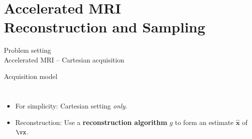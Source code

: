 

\section{Accelerated MRI\\[-3mm]{\normalsize Reconstruction and Sampling}}

\begin{frame}{Problem setting\\[-3mm]{\normalsize Accelerated MRI -- Cartesian acquisition}}
\vspace{-2mm}
 \begin{block}{Acquisition model}
\centering
{}
 \end{block}


\begin{columns}
\begin{itemize}
\item For simplicity: Cartesian setting \textit{only}. \\[.3cm]

\item Reconstruction: Use a \textbf{reconstruction algorithm} $g$ to form an estimate $\mathbf{\hat{x}}$ of $\vx$.
\end{itemize}


\end{columns}
\end{frame}
